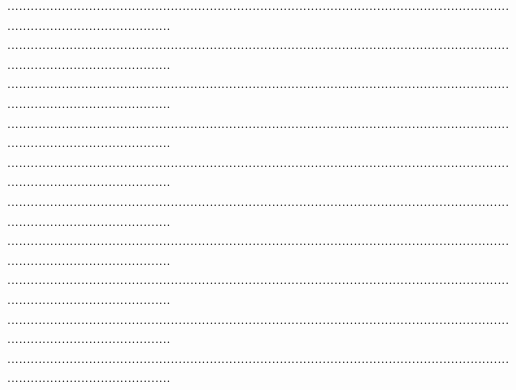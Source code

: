 \documentclass{article}
\begin{document}
\begin{footnotesize}
\begin{enumerate}
    ...........................................................................................................................................................................\newline
    ...........................................................................................................................................................................\newline
    ...........................................................................................................................................................................\newline
    ...........................................................................................................................................................................\newline
    ...........................................................................................................................................................................\newline
    ...........................................................................................................................................................................\newline
    ...........................................................................................................................................................................\newline
    ...........................................................................................................................................................................\newline
    ...........................................................................................................................................................................\newline
    ...........................................................................................................................................................................
\end{enumerate}
\end{footnotesize}
\end{document}
